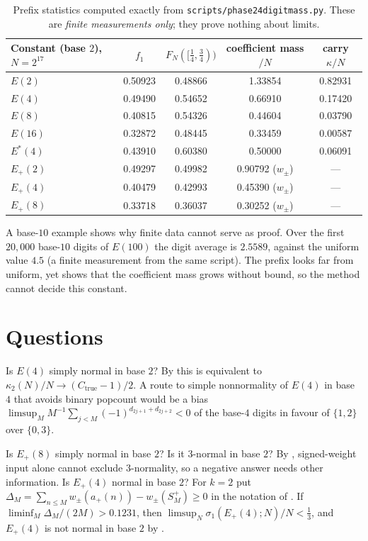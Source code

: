\documentclass[11pt]{article}
\newcommand{\ttbreak}{\discretionary{}{}{}}
\newcommand{\ttt}[1]{\texttt{\begingroup\def\_{\textunderscore\ttbreak}#1\endgroup}}
\newcommand{\Ctrue}{C_{\mathrm{true}}}
\newcommand{\wpm}{w_{\pm}}
\begin{document}
\begin{table}[ht]
\centering\small
\begin{tabular}{@{}lcccc@{}}
\toprule
Constant (base $2$), $N=2^{17}$ & $f_1$ & $F_N([\frac14,\frac34))$ & coefficient mass$/N$ & carry $\kappa/N$ \\
\midrule
$E(2)$ & 0.50923 & 0.48866 & 1.33854 & 0.82931 \\
$E(4)$ & 0.49490 & 0.54652 & 0.66910 & 0.17420 \\
$E(8)$ & 0.40815 & 0.54326 & 0.44604 & 0.03790 \\
$E(16)$ & 0.32872 & 0.48445 & 0.33459 & 0.00587 \\
$E^*(4)$ & 0.43910 & 0.60380 & 0.50000 & 0.06091 \\
$E_+(2)$ & 0.49297 & 0.49982 & 0.90792 ($\wpm$) & --- \\
$E_+(4)$ & 0.40479 & 0.42993 & 0.45390 ($\wpm$) & --- \\
$E_+(8)$ & 0.33718 & 0.36037 & 0.30252 ($\wpm$) & --- \\
\bottomrule
\end{tabular}
\caption{Prefix statistics computed exactly from \ttt{scripts/phase24\_digit\_mass.py}. These are \emph{finite measurements only}; they prove nothing about limits.}\label{tab:measure}
\end{table}

A base-$10$ example shows why finite data cannot serve as proof. Over the first $20{,}000$ base-$10$ digits of $E(100)$ the digit average is $2.5589$, against the uniform value $4.5$ (a finite measurement from the same script). The prefix looks far from uniform, yet  shows that the coefficient mass grows without bound, so the method cannot decide this constant.

\section{Questions}\label{sec:questions}

\begin{question}\label{q:E4}
Is $E(4)$ simply normal in base $2$? By  this is equivalent to $\kappa_2(N)/N\to(\Ctrue-1)/2$. A route to simple nonnormality of $E(4)$ in base $4$ that avoids binary popcount would be a bias $\limsup_MM^{-1}\sum_{j<M}(-1)^{d_{2j+1}+d_{2j+2}}<0$ of the base-$4$ digits in favour of $\{1,2\}$ over $\{0,3\}$.
\end{question}

\begin{question}\label{q:Eplus}
Is $E_+(8)$ simply normal in base $2$? Is it $3$-normal in base $2$? By , signed-weight input alone cannot exclude $3$-normality, so a negative answer needs other information. Is $E_+(4)$ normal in base $2$? For $k=2$ put $\Delta_M=\sum_{n\le M}\wpm(a_+(n))-\wpm(S_M^+)\ge0$ in the notation of . If $\liminf_M\Delta_M/(2M)>0.1231$, then $\limsup_N\sigma_1(E_+(4);N)/N<\frac13$, and $E_+(4)$ is not normal in base $2$ by .
\end{question}
\end{document}
